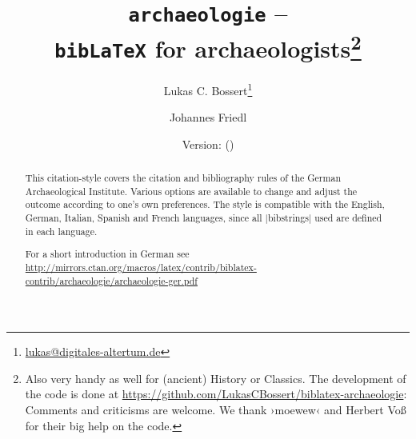 \documentclass[a4paper,
10pt,
greek,
french,
spanish,
italian,
ngerman,
english
]{ltxdoc}
\begin{document}
\title{\texttt{archaeologie} -- \\\texttt{bib\LaTeX} for archaeologists\footnote{Also very handy as well for (ancient) History or Classics.
The development of the code is done at \url{https://github.com/LukasCBossert/biblatex-archaeologie}: 
Comments and criticisms are welcome.
We thank  ›moewew‹ and Herbert Voß for their big help on the code.%
}}
\author{Lukas C. Bossert\thanks{\href{mailto:lukas@digitales-altertum.de}{lukas@digitales-altertum.de}} \and Johannes Friedl}
\date{Version: \archaeologieversion{} (\archaeologiedate)} 
 \maketitle
 \begin{abstract}
\noindent This citation-style covers the citation and bibliography rules of the German Archaeological Institute. 
Various options are available to change and adjust the outcome according to one's own preferences. 
The style is compatible with the English, German, Italian, Spanish and French languages, since all |bibstrings| used are defined in each language.

For a short introduction in German see \url{http://mirrors.ctan.org/macros/latex/contrib/biblatex-contrib/archaeologie/archaeologie-ger.pdf}
 \end{abstract}


\begin{multicols}{2}
\footnotesize\parskip=0mm \tableofcontents
\end{multicols}
\end{document}
